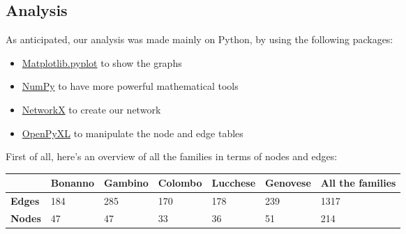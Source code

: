 \documentclass{article}
\begin{document}
\subsection*{\hypertarget{Analysis}{\textcolor{Titoli}{Analysis}}}
As anticipated, our analysis was made mainly on Python, by using the following packages:
\begin{itemize}
    \item \href{https://matplotlib.org/stable/api/_as_gen/matplotlib.pyplot.html}{Matplotlib.pyplot} to show the graphs
    \item \href{https://numpy.org/}{NumPy} to have more powerful mathematical tools
    \item \href{https://networkx.org/}{NetworkX} to create our network
    \item \href{https://openpyxl.readthedocs.io/en/stable/}{OpenPyXL} to manipulate the node and edge tables
\end{itemize}
First of all, here's an overview of all the families in terms of nodes and edges:



\begin{table}[h]
\advance\leftskip-0.6cm
\begin{tabular}{|l|l|l|l|l|l|l|}
\hline
\rowcolor[HTML]{DAE8FC} 
\multicolumn{1}{|c|}{\cellcolor[HTML]{DAE8FC}} & \multicolumn{1}{c|}{\cellcolor[HTML]{DAE8FC}\textbf{Bonanno}} & \textbf{Gambino} & \multicolumn{1}{c|}{\cellcolor[HTML]{DAE8FC}\textbf{Colombo}} & \textbf{Lucchese} & \textbf{Genovese} & \textbf{All the families} \\ \hline
\rowcolor[HTML]{ECF4FF} 
\cellcolor[HTML]{DAE8FC}\textbf{Edges} & 184 & 285 & 170 & 178 & 239 & 1317 \\ \hline
\rowcolor[HTML]{ECF4FF} 
\cellcolor[HTML]{DAE8FC}\textbf{Nodes} & 47 & 47 & 33 & 36 & 51 & 214 \\ \hline
\end{tabular}
\end{table}
\end{document}
